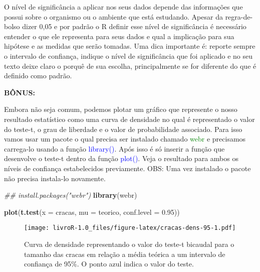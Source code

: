 \documentclass[titlepage, oneside, openany, a4paper]{book}
\newenvironment{Shaded}{\begin{snugshade}}{\end{snugshade}}
\newcommand{\CommentTok}[1]{\textcolor[rgb]{0.56,0.35,0.01}{\textit{#1}}}
\newcommand{\DataTypeTok}[1]{\textcolor[rgb]{0.13,0.29,0.53}{#1}}
\newcommand{\FloatTok}[1]{\textcolor[rgb]{0.00,0.00,0.81}{#1}}
\newcommand{\KeywordTok}[1]{\textcolor[rgb]{0.13,0.29,0.53}{\textbf{#1}}}
\newcommand{\NormalTok}[1]{#1}
\begin{document}
O nível de significância a aplicar nos seus dados depende das informações que possui sobre o organismo ou o ambiente que está estudando. Apesar da regra-de-bolso dizer 0,05 e por padrão o R definir esse nível de significância é necessário entender o que ele representa para seus dados e qual a implicação para sua hipótese e as medidas que serão tomadas. Uma dica importante é: reporte sempre o intervalo de confiança, indique o nível de significância que foi aplicado e no seu texto deixe claro o porquê de sua escolha, principalmente se for diferente do que é definido como padrão.

\textbf{BÔNUS:}

Embora não seja comum, podemos plotar um gráfico que represente o nosso resultado estatístico como uma curva de densidade no qual é representado o valor do teste-t, o grau de liberdade e o valor de probabilidade associado. Para isso vamos usar um pacote o qual precisa ser instalado chamado \textcolor{green}{webr} e precisamos carrega-lo usando a função \textcolor{blue}{library()}. Após isso é só inserir a função que desenvolve o teste-t dentro da função \textcolor{blue}{plot()}. Veja o resultado para ambos os níveis de confiança estabelecidos previamente. OBS: Uma vez instalado o pacote não precisa instala-lo novamente.

\begin{Shaded}
\begin{Highlighting}[]
\CommentTok{## install.packages("webr")}
\KeywordTok{library}\NormalTok{(webr)}
\end{Highlighting}
\end{Shaded}

\begin{Shaded}
\begin{Highlighting}[]
\KeywordTok{plot}\NormalTok{(}\KeywordTok{t.test}\NormalTok{(}\DataTypeTok{x =}\NormalTok{ cracas, }\DataTypeTok{mu =}\NormalTok{ teorico, }\DataTypeTok{conf.level =} \FloatTok{0.95}\NormalTok{))}
\end{Highlighting}
\end{Shaded}

\begin{figure}
\centering
\texttt{[image: livroR-1.0\_files/figure-latex/cracas-dens-95-1.pdf]}
\caption{\label{fig:cracas-dens-95}Curva de densidade representando o valor do teste-t bicaudal para o tamanho das cracas em relação a média teórica a um intervalo de confiança de 95\%. O ponto azul indica o valor do teste.}
\end{figure}
\end{document}
